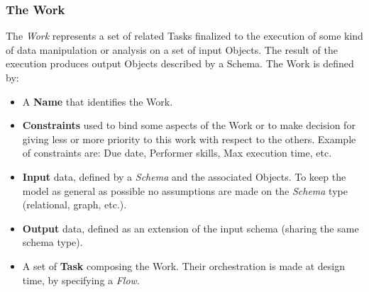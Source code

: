 \subsubsection{The Work}\label{data:work}
The \emph{Work} represents a set of related Tasks finalized to the execution of
some kind of data manipulation or analysis on a set of input Objects. The
result of the execution produces output Objects described by a Schema. The Work
is defined by:
\begin{itemize}
    \item A \textbf{Name} that identifies the Work.

    \item \textbf{Constraints} used to bind some aspects of the Work or to make
    decision for giving less or more priority to this work with respect to the
    others. Example of constraints are: Due date, Performer skills, Max execution
    time, etc.

    \item \textbf{Input} data, defined by a \emph{Schema} and the associated
    Objects. To keep the model as general as possible no assumptions are made on
    the \emph{Schema} type (relational, graph, etc.).
    \item \textbf{Output} data, defined as an extension of the input schema
    (sharing the same schema type).

    \item A set of \textbf{Task} composing the Work. Their orchestration is made
    at design time, by specifying a \emph{Flow}.
\end{itemize}

